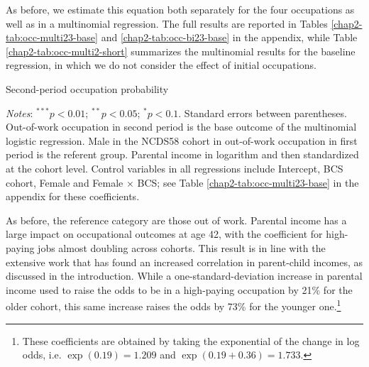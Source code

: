 As before, we estimate this equation both separately for the four occupations as well as in a multinomial regression. The full results are reported in Tables \ref{chap2-tab:occ-multi23-base} and \ref{chap2-tab:occ-bi23-base} in the appendix, while Table \ref{chap2-tab:occ-multi2-short} summarizes the multinomial results for the baseline regression, in which we do not consider the effect of initial occupations.
\begin{table}[!tb]
    \centering
    \caption{Second-period occupation probability}
    \label{chap2-tab:occ-multi2-short}
    \begin{threeparttable}
        \setlength{\tabcolsep}{18pt}
        
        \begin{tablenotes}[flushleft]
            \footnotesize{\item\textit{Notes}: 
            $^{***}p<0.01$; $^{**}p<0.05$; $^{*}p<0.1$. Standard errors between parentheses. 
            Out-of-work occupation in second period is the base outcome of the multinomial logistic regression.
            Male in the NCDS58 cohort in out-of-work occupation in first period is the referent group. 
            Parental income in logarithm and then standardized at the cohort level. 
            Control variables in all regressions include Intercept, BCS cohort, Female and Female $\times$ BCS; see Table \ref{chap2-tab:occ-multi23-base} in the appendix for these coefficients.}
        \end{tablenotes}
    \end{threeparttable}
\end{table}

As before, the reference category are those out of work. Parental income has a large impact on occupational outcomes at age 42, with the coefficient for high-paying jobs almost doubling across cohorts. This result is in line with the extensive work that has found an increased correlation in parent-child incomes, as discussed in the introduction. While a one-standard-deviation increase in parental income used to raise the odds to be in a high-paying occupation by 21\% for the older cohort, this same increase raises the odds by 73\% for the younger one.\footnote{These coefficients are obtained by taking the exponential of the change in log odds, i.e. $\exp(0.19) = 1.209$ and $\exp(0.19+0.36) = 1.733$.} 

